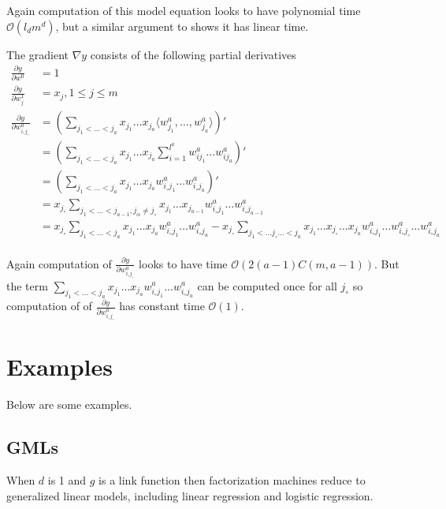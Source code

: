 \documentclass[14pt, reqno]{amsart}
\theoremstyle{definition}
\begin{document}
Again computation of this model equation looks to have polynomial time $\mathcal{O}(l_d m^d)$, but a similar argument to \cite[lemma 3.1]{factorization_machines} shows it has linear time.

The gradient $\nabla y$ consists of the following partial derivatives
\begin{align*}
\frac{\partial y}{\partial w^0} & = 1 \\
\frac{\partial y}{\partial w_j^1} & = x_j, 1 \leq j \leq m \\
\frac{\partial y}{\partial w_{i_{\circ} j_{\circ}}^a} & = \left( \sum\limits_{j_1 < \dots < j_a} x_{j_1} \dots x_{j_a} \langle w_{j_1}^a, \dots,  w_{j_a}^a \rangle \right)' \\
 & = \left( \sum\limits_{j_1 < \dots < j_a} x_{j_1} \dots x_{j_a} \sum\limits_{i = 1}^{l^a} w_{i j_1}^a \dots w_{i j_a}^a \right)' \\
 & = \left( \sum\limits_{j_1 < \dots < j_a} x_{j_1} \dots x_{j_a} w_{i_{\circ} j_1}^a \dots w_{i_{\circ} j_a}^a \right)' \\
 & = x_{j_{\circ}} \sum\limits_{j_1 < \dots < j_{a-1}, j_{\alpha} \neq j_{\circ}} x_{j_1} \dots x_{j_{a-1}} w_{i_{\circ} j_1}^a \dots w_{i_{\circ} j_{a-1}}^a \\
 & = x_{j_{\circ}} \sum\limits_{j_1 < \dots < j_a} x_{j_1} \dots x_{j_a} w_{i_{\circ} j_1}^a \dots w_{i_{\circ} j_a}^a - x_{j_{\circ}} \sum\limits_{j_1 < \dots j_{\circ} \dots < j_a} x_{j_1} \dots x_{j_{\circ}} \dots x_{j_a} w_{i_{\circ} j_1}^a \dots w_{i_{\circ} j_{\circ}}^a \dots w_{i_{\circ} j_a}^a \\ 
\end{align*}

Again computation of $\frac{\partial y}{\partial w_{i_{\circ} j_{\circ}}^a}$ looks to have time $\mathcal{O}(2(a - 1)C(m, a - 1))$. But the term $\sum\limits_{j_1 < \dots < j_a} x_{j_1} \dots x_{j_a} w_{i_{\circ} j_1}^a \dots w_{i_{\circ} j_a}^a$ can be computed once for all $j_{\circ}$ so computation of of $\frac{\partial y}{\partial w_{i_{\circ} j_{\circ}}^a}$ has constant time $\mathcal{O}(1)$.

\vfill
\pagebreak

\section{Examples} Below are some examples.

\vfill
\pagebreak

\subsection{GMLs} When $d$ is 1 and $g$ is a link function then factorization machines reduce to generalized linear models, including linear regression and logistic regression.
\end{document}
